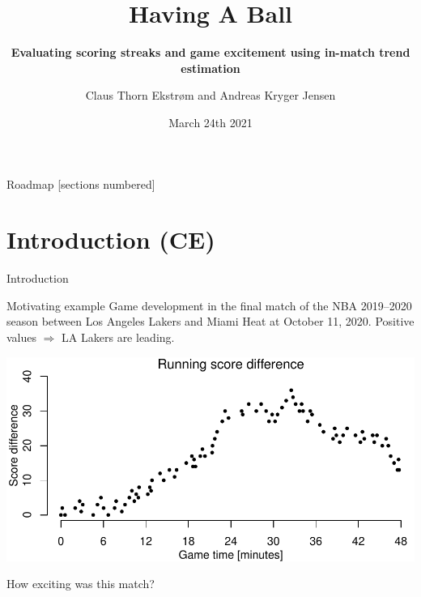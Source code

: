 \documentclass[ignorenonframetext,xcolor=pdflatex,table,dvipsnames,serif]{beamer}
\title{{\tiny \faBasketballBall} {\scriptsize \faBasketballBall} {\small \faBasketballBall} {\faBasketballBall} {\LARGE \faBasketballBall} {\huge \faBasketballBall} Having A Ball {\huge \faBasketballBall} {\LARGE \faBasketballBall} {\faBasketballBall} {\small \faBasketballBall} {\scriptsize \faBasketballBall} {\tiny \faBasketballBall}}
\subtitle{\textbf{Evaluating scoring streaks and game excitement using in-match trend estimation}}
\date{March 24th 2021}
\author{Claus Thorn Ekstrøm and Andreas Kryger Jensen}
\institute{Biostatistics, Department of Public Health\\ University of Copenhagen}
\begin{document}
\frame[plain]{\titlepage}
 
\begin{frame}{Roadmap}
  [sections numbered]
  \tableofcontents[hideallsubsections]
\end{frame}
 

\section{Introduction (CE)}

\begin{frame}{Introduction}
\end{frame}

\begin{frame}{Motivating example}
Game development in the final match of the NBA 2019–2020 season between Los Angeles Lakers and Miami Heat at October 11, 2020. Positive values $\Rightarrow$ LA Lakers are leading.

\includegraphics[scale=0.7]{fig1.pdf}

How exciting was this match?
\end{frame}







\end{document}
